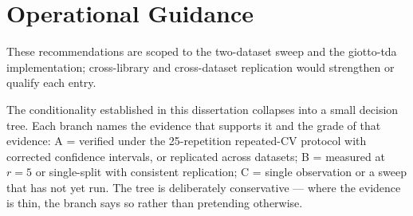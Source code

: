 \documentclass[12pt, a4paper]{report}
\theoremstyle{definition}
\theoremstyle{plain}
\theoremstyle{remark}
\begin{document}
\section{Operational Guidance}

These recommendations are scoped to the two-dataset sweep and the
giotto-tda implementation; cross-library and cross-dataset replication
would strengthen or qualify each entry.

The conditionality established in this dissertation collapses into a
small decision tree. Each branch names the evidence that supports it and
the grade of that evidence: A = verified under the 25-repetition
repeated-CV protocol with corrected confidence intervals, or replicated
across datasets; B = measured at $r{=}5$ or single-split with consistent
replication; C = single observation or a sweep that has not yet run. The
tree is deliberately conservative --- where the evidence is thin, the
branch says so rather than pretending otherwise.
\end{document}
